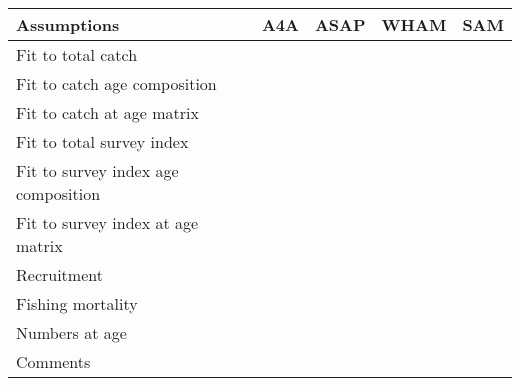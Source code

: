 
\begin{tabular}{lllll}
\toprule
Assumptions & A4A & ASAP & WHAM & SAM\\
\midrule
Fit to total catch & & & & \\
Fit to catch age composition & & & & \\
Fit to catch at age matrix & & & & \\
Fit to total survey index & & & & \\
Fit to survey index age composition & & & & \\
Fit to survey index at age matrix & & & & \\
Recruitment & & & & \\
Fishing mortality & & & & \\
Numbers at age & & & & \\
Comments & & & & \\
\bottomrule
\end{tabular}
